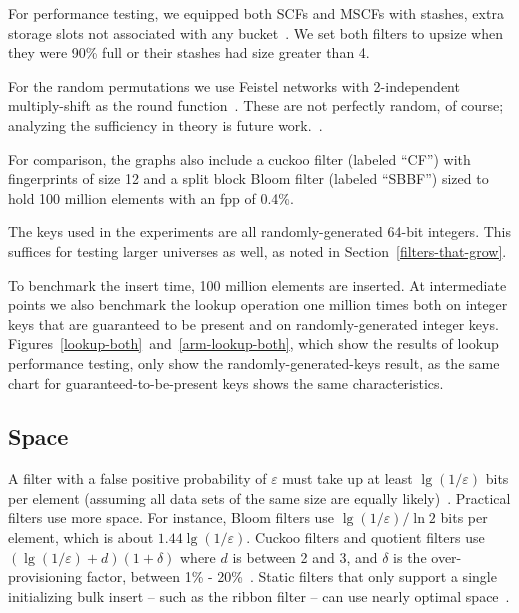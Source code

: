 \documentclass[letterpaper,twocolumn,10pt]{article}
\newcommand{\TCF}{SCF}
\newcommand{\MTCF}{MSCF}
\newcommand{\TCF}{TCF}
\newcommand{\MTCF}{MTCF}
\begin{document}
For performance testing, we equipped both \TCF{}s and \MTCF{}s with stashes, extra storage slots not associated with any bucket~\cite{stash}.
We set both filters to upsize when they were 90\% full or their stashes had size greater than 4.

For the random permutations we use Feistel networks with 2-independent multiply-shift as the round function~\cite{two-independent-multiply-shift}.
These are not perfectly random, of course; analyzing the sufficiency in theory is future work.~\cite{why-simple,backyard}.

For comparison, the graphs also include a cuckoo filter (labeled ``CF'') with fingerprints of size 12 and a split block Bloom filter (labeled ``SBBF'') sized to hold 100 million elements with an fpp of 0.4\%.

The keys used in the experiments are all randomly-generated 64-bit integers.
This suffices for testing larger universes as well, as noted in Section~\ref{filters-that-grow}.

To benchmark the insert time, 100 million elements are inserted.
At intermediate points we also benchmark the lookup operation one million times both on integer keys that are guaranteed to be present and on randomly-generated integer keys.
Figures~\ref{lookup-both}~and~\ref{arm-lookup-both}, which show the results of lookup performance testing, only show the randomly-generated-keys result, as the same chart for guaranteed-to-be-present keys shows the same characteristics.

\subsection{Space}

A filter with a false positive probability of $\varepsilon$ must take up at least $\lg (1/\varepsilon)$ bits per element (assuming all data sets of the same size are equally likely)~\cite{lower-bound}.
Practical filters use more space.
For instance, Bloom filters use $\lg (1/\varepsilon)/\ln 2$ bits per element, which is about $1.44 \lg (1/\varepsilon)$.
Cuckoo filters and quotient filters use $(\lg (1/\varepsilon) + d) (1 + \delta)$ where $d$ is between 2 and 3, and $\delta$ is the over-provisioning factor, between 1\% - 20\%~\cite{cuckoo,quotient-filter,vector-quotient}.
Static filters that only support a single initializing bulk insert -- such as the ribbon filter -- can use nearly optimal space~\cite{ribbon}.
\end{document}
